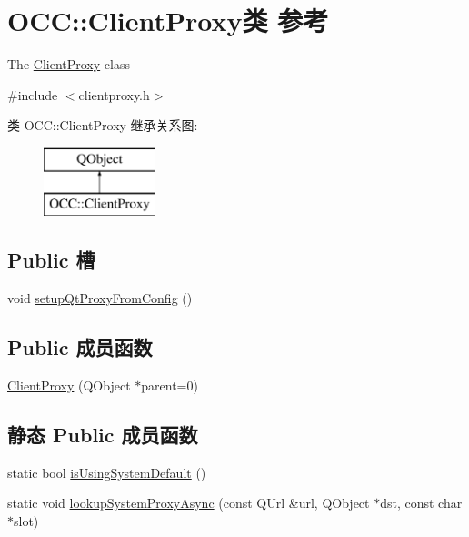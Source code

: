 \hypertarget{class_o_c_c_1_1_client_proxy}{}\section{O\+CC\+:\+:Client\+Proxy类 参考}
\label{class_o_c_c_1_1_client_proxy}


The \hyperlink{class_o_c_c_1_1_client_proxy}{Client\+Proxy} class  




{\ttfamily \#include $<$clientproxy.\+h$>$}

类 O\+CC\+:\+:Client\+Proxy 继承关系图\+:\begin{figure}[H]
\begin{center}
\leavevmode
\includegraphics[height=2.000000cm]{class_o_c_c_1_1_client_proxy}
\end{center}
\end{figure}
\subsection*{Public 槽}
\begin{DoxyCompactItemize}
\item 
void \hyperlink{class_o_c_c_1_1_client_proxy_a2c371c059407a4d47cbd792f61211d34}{setup\+Qt\+Proxy\+From\+Config} ()
\end{DoxyCompactItemize}
\subsection*{Public 成员函数}
\begin{DoxyCompactItemize}
\item 
\hyperlink{class_o_c_c_1_1_client_proxy_a826b8d6e3a56ce3d5e96130ad1de3859}{Client\+Proxy} (Q\+Object $\ast$parent=0)
\end{DoxyCompactItemize}
\subsection*{静态 Public 成员函数}
\begin{DoxyCompactItemize}
\item 
static bool \hyperlink{class_o_c_c_1_1_client_proxy_a505377e2f6aa148d7950256cbde49b7c}{is\+Using\+System\+Default} ()
\item 
static void \hyperlink{class_o_c_c_1_1_client_proxy_aecedffefc443606bc8565ad3b95b176b}{lookup\+System\+Proxy\+Async} (const Q\+Url \&url, Q\+Object $\ast$dst, const char $\ast$slot)
\end{DoxyCompactItemize}


